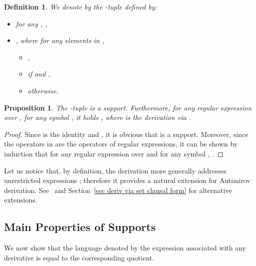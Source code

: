 \documentclass{article}
\newtheorem{definition}{Definition}
\newtheorem{proposition}{Proposition}
\begin{document}
   \begin{definition}\label{def support brzo}
        We denote by  the -tuple defined by:
    \begin{itemize}
      \item for any , ,
      \item , where for any  elements in ,
      \begin{itemize}
        \item ,
        \item  if  and ,
        \item  otherwise.
      \end{itemize}
    \end{itemize}
   \end{definition}
   
   \begin{proposition}
     The -tuple  is a support. Furthermore, for any regular expression  over , for any symbol , it holds , where   is the derivation \emph{via} .
   \end{proposition}
   \begin{proof}
     Since  is the identity and , it is obvious that  is a support. Moreover, since the operators in  are the operators of regular expressions, it can be shown by induction that for any regular expression  over  and for any symbol , .
   \end{proof}
   
    Let us notice that, by definition, the derivation  more generally addresses  unrestricted expressions ; therefore it provides a natural extension for Antimirov derivation. See~\cite{CCM11b} and Section~\ref{sec deriv via set clausal form} for alternative extensions.
   
 
 
 \subsection{Main Properties of Supports}
  
We now show that the language denoted by the expression associated with any derivative  is equal to the corresponding quotient. 
\end{document}

